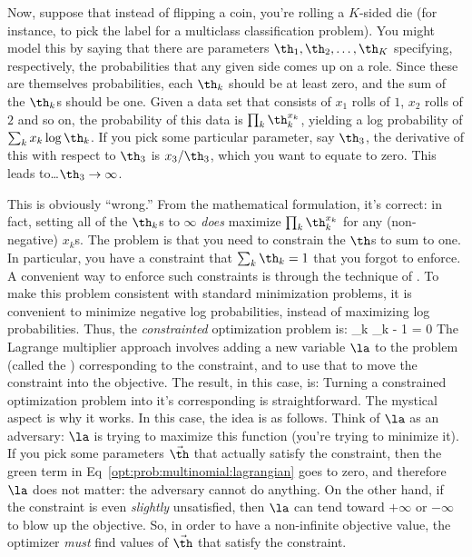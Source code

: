 
Now, suppose that instead of flipping a coin, you're rolling a
$K$-sided die (for instance, to pick the label for a multiclass
classification problem).  You might model this by saying that there
are parameters $\th_1, \th_2, \dots, \th_K$ specifying, respectively,
the probabilities that any given side comes up on a role.  Since these
are themselves probabilities, each $\th_k$ should be at least zero,
and the sum of the $\th_k$s should be one.  Given a data set that
consists of $x_1$ rolls of $1$, $x_2$ rolls of $2$ and so on, the
probability of this data is $\prod_k \th_k^{x_k}$, yielding a log
probability of $\sum_k x_k \log \th_k$.  If you pick some particular
parameter, say $\th_3$, the derivative of this with respect to $\th_3$
is $x_3 / \th_3$, which you want to equate to zero.  This leads
to\dots $\th_3 \rightarrow \infty$.

This is obviously ``wrong.''  From the mathematical formulation, it's
correct: in fact, setting all of the $\th_k$s to $\infty$ \emph{does}
maximize $\prod_k \th_k^{x_k}$ for any (non-negative) $x_k$s.  The
problem is that you need to constrain the $\th$s to sum to one.  In
particular, you have a constraint that $\sum_k \th_k = 1$ that you
forgot to enforce.  A convenient way to enforce such constraints is
through the technique of .  To make this
problem consistent with standard minimization problems, it is
convenient to minimize negative log probabilities, instead of
maximizing log probabilities.  Thus, the \emph{constrainted}
optimization problem is:
%
%
{\textcolor{darkergreen}{\sum_k \th_k - 1 = 0}}
%
The Lagrange multiplier approach involves adding a new variable $\la$
to the problem (called the ) corresponding
to the constraint, and to use that to move the constraint into the
objective.  The result, in this case, is:
%
%
Turning a constrained optimization problem into it's corresponding
 is straightforward.  The mystical aspect is why
it works.  In this case, the idea is as follows.  Think of $\la$ as an
adversary: $\la$ is trying to maximize this function (you're trying to
minimize it).  If you pick some parameters $\vec\th$ that actually
satisfy the constraint, then the green term in
Eq~\eqref{opt:prob:multinomial:lagrangian} goes to zero, and therefore
$\la$ does not matter: the adversary cannot do anything.  On the other
hand, if the constraint is even \emph{slightly} unsatisfied, then
$\la$ can tend toward $+\infty$ or $-\infty$ to blow up the objective.
So, in order to have a non-infinite objective value, the optimizer
\emph{must} find values of $\vec\th$ that satisfy the constraint.

